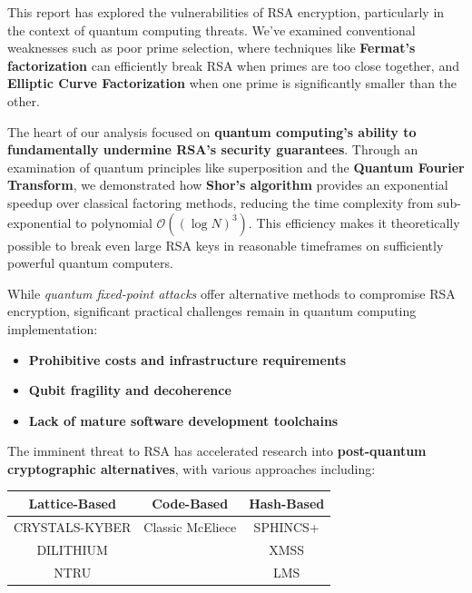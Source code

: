 \documentclass{article}
\begin{document}
This report has explored the vulnerabilities of RSA encryption, particularly in the context of quantum computing threats. We've examined conventional weaknesses such as poor prime selection, where techniques like \textbf{Fermat's factorization} can efficiently break RSA when primes are too close together, and \textbf{Elliptic Curve Factorization} when one prime is significantly smaller than the other.

The heart of our analysis focused on \textbf{quantum computing's ability to fundamentally undermine RSA's security guarantees}. Through an examination of quantum principles like superposition and the \textbf{Quantum Fourier Transform}, we demonstrated how \textbf{Shor's algorithm} provides an exponential speedup over classical factoring methods, reducing the time complexity from sub-exponential to polynomial \textbf{$\mathcal{O}((\log N)^3)$}. This efficiency makes it theoretically possible to break even large RSA keys in reasonable timeframes on sufficiently powerful quantum computers.

While \textit{quantum fixed-point attacks} offer alternative methods to compromise RSA encryption, significant practical challenges remain in quantum computing implementation:

\begin{itemize}
    \item \textbf{Prohibitive costs and infrastructure requirements}
    \item \textbf{Qubit fragility and decoherence}
    \item \textbf{Lack of mature software development toolchains}
\end{itemize}

The imminent threat to RSA has accelerated research into \textbf{post-quantum cryptographic alternatives}, with various approaches including:

\begin{center}
    \begin{tabular}{|c|c|c|}
        \hline
        \rowcolor{gray!20} \textbf{Lattice-Based} & \textbf{Code-Based} & \textbf{Hash-Based} \\
        \hline
        CRYSTALS-KYBER                            & Classic McEliece    & SPHINCS+            \\
        DILITHIUM                                 &                     & XMSS                \\
        NTRU                                      &                     & LMS                 \\
        \hline
    \end{tabular}
\end{center}
\end{document}

